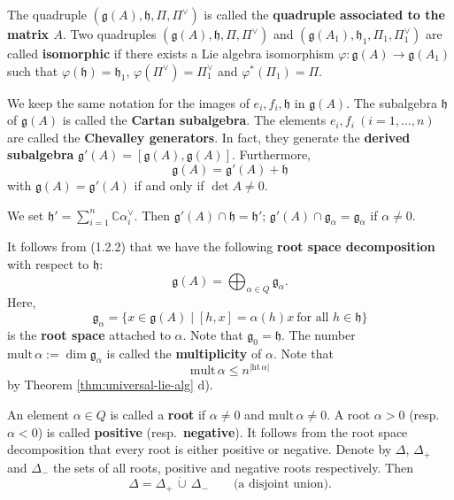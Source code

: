 \documentclass[12pt]{article}
\begin{document}
The quadruple $(\mathfrak{g}(A),\mathfrak{h},\Pi,\Pi^\vee)$ is called the
\textbf{quadruple associated to the matrix $A$}. Two quadruples
$(\mathfrak{g}(A),\mathfrak{h},\Pi,\Pi^\vee)$ and
$(\mathfrak{g}(A_1),\mathfrak{h}_1,\Pi_1,\Pi_1^\vee)$ are called
\textbf{isomorphic} if there exists a Lie algebra isomorphism
$\varphi : \mathfrak{g}(A)\to \mathfrak{g}(A_1)$ such that
$\varphi(\mathfrak{h})=\mathfrak{h}_1$, $\varphi(\Pi^\vee)=\Pi_1^\vee$
and $\varphi^*(\Pi_1)=\Pi$.


We keep the same notation for the images of $e_i,f_i,\mathfrak{h}$ in
$\mathfrak{g}(A)$. The subalgebra $\mathfrak{h}$ of $\mathfrak{g}(A)$ is
called the \textbf{Cartan subalgebra}. The elements $e_i,f_i \ (i=1,\dots,n)$
are called the \textbf{Chevalley generators}. In fact, they generate the
\textbf{derived subalgebra} $\mathfrak{g}'(A)=[\mathfrak{g}(A),\mathfrak{g}(A)]$.
Furthermore,
\[
    \mathfrak{g}(A) = \mathfrak{g}'(A) + \mathfrak{h}
\]
with $\mathfrak{g}(A)=\mathfrak{g}'(A)$ if and only if $\det A \neq 0$.

We set $\mathfrak{h}' = \sum_{i=1}^n \mathbb{C}\alpha_i^\vee$. Then
$\mathfrak{g}'(A)\cap \mathfrak{h} = \mathfrak{h}'$;
$\mathfrak{g}'(A)\cap \mathfrak{g}_\alpha = \mathfrak{g}_\alpha$ if $\alpha\neq 0$.

It follows from (1.2.2) that we have the following \textbf{root space decomposition}
with respect to $\mathfrak{h}$:
\begin{equation}\label{1.3.1}
    \mathfrak{g}(A) = \bigoplus_{\alpha \in Q} \mathfrak{g}_\alpha.
\end{equation}
Here,
\[
    \mathfrak{g}_\alpha = \{ x \in \mathfrak{g}(A) \mid [h,x] = \alpha(h)x
    \ \text{for all } h \in \mathfrak{h}\}
\]
is the \textbf{root space} attached to $\alpha$. Note that
$\mathfrak{g}_0 = \mathfrak{h}$. The number
$\mathrm{mult}\,\alpha := \dim \mathfrak{g}_\alpha$ is called the
\textbf{multiplicity} of $\alpha$. Note that
\begin{equation}\label{1.3.2}
    \mathrm{mult}\,\alpha \leq n^{|\mathrm{ht}\,\alpha|}
\end{equation} by Theorem \ref{thm:universal-lie-alg} d).

An element $\alpha \in Q$ is called a \textbf{root} if $\alpha \neq 0$ and
$\mathrm{mult}\,\alpha \neq 0$. A root $\alpha > 0$ (resp.\ $\alpha < 0$)
is called \textbf{positive} (resp.\ \textbf{negative}). It follows from the root space decomposition that every root is either positive or negative. Denote by $\Delta$, $\Delta_+$
and $\Delta_-$ the sets of all roots, positive and negative roots respectively.
Then
\[
    \Delta = \Delta_+ \,\dot{\cup}\, \Delta_- \qquad \text{(a disjoint union).}
\]
\end{document}
